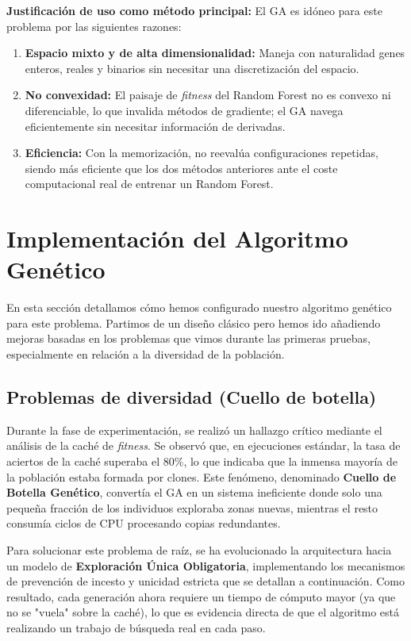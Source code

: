 \documentclass[12pt, a4paper]{article}
\begin{document}
\textbf{Justificación de uso como método principal:} El GA es idóneo para este problema
por las siguientes razones:
\begin{enumerate}[itemsep=0.2em]
  \item \textbf{Espacio mixto y de alta dimensionalidad:} Maneja con naturalidad genes
        enteros, reales y binarios sin necesitar una discretización del espacio.
  \item \textbf{No convexidad:} El paisaje de \textit{fitness} del Random Forest no es
        convexo ni diferenciable, lo que invalida métodos de gradiente; el GA navega
        eficientemente sin necesitar información de derivadas.
  \item \textbf{Eficiencia:} Con la memorización, no reevalúa configuraciones repetidas,
        siendo más eficiente que los dos métodos anteriores ante el coste computacional
        real de entrenar un Random Forest.
\end{enumerate}

\section{Implementación del Algoritmo Genético}

En esta sección detallamos cómo hemos configurado nuestro algoritmo genético para este problema.
Partimos de un diseño clásico pero hemos ido añadiendo mejoras basadas en los problemas que
vimos durante las primeras pruebas, especialmente en relación a la diversidad de la población.

\subsection{Problemas de diversidad (Cuello de botella)}

Durante la fase de experimentación, se realizó un hallazgo crítico mediante el análisis de la
caché de \textit{fitness}. Se observó que, en ejecuciones estándar, la tasa de aciertos de
la caché superaba el 80\%, lo que indicaba que la inmensa mayoría de la población estaba
formada por clones. Este fenómeno, denominado \textbf{Cuello de Botella Genético}, convertía
el GA en un sistema ineficiente donde solo una pequeña fracción de los individuos exploraba
zonas nuevas, mientras el resto consumía ciclos de CPU procesando copias redundantes.

Para solucionar este problema de raíz, se ha evolucionado la arquitectura hacia un modelo de
\textbf{Exploración Única Obligatoria}, implementando los mecanismos de prevención de incesto
y unicidad estricta que se detallan a continuación. Como resultado, cada generación ahora requiere
un tiempo de cómputo mayor (ya que no se "vuela" sobre la caché), lo que es evidencia directa
de que el algoritmo está realizando un trabajo de búsqueda real en cada paso.
\end{document}
